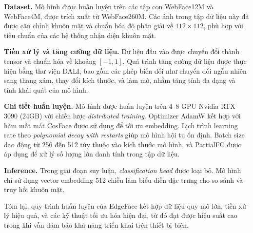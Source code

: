 \textbf{Dataset.} Mô hình được huấn luyện trên các tập con WebFace12M và WebFace4M, được trích xuất từ WebFace260M. 
Các ảnh trong tập dữ liệu này đã được căn chỉnh khuôn mặt và chuẩn hóa độ phân giải về $112\times112$, phù hợp với tiêu chuẩn của các hệ thống nhận diện khuôn mặt.

\textbf{Tiền xử lý và tăng cường dữ liệu.} Dữ liệu đầu vào được chuyển đổi thành tensor và chuẩn hóa về khoảng $[-1,1]$. 
Quá trình tăng cường dữ liệu được thực hiện bằng thư viện DALI, bao gồm các phép biến đổi như chuyển đổi ngẫu nhiên sang thang xám, thay đổi kích thước, và làm mờ, nhằm tăng tính đa dạng và tính khái quát của mô hình.

\textbf{Chi tiết huấn luyện.} Mô hình được huấn luyện trên 4--8 GPU Nvidia RTX 3090 (24GB) với chiến lược \textit{distributed training}. 
Optimizer AdamW kết hợp với hàm mất mát CosFace được sử dụng để tối ưu embedding. 
Lịch trình learning rate theo \textit{polynomial decay with restarts} giúp mô hình hội tụ ổn định. 
Batch size dao động từ 256 đến 512 tùy thuộc vào kích thước mô hình, và PartialFC được áp dụng để xử lý số lượng lớn danh tính trong tập dữ liệu.

\textbf{Inference.} Trong giai đoạn suy luận, \textit{classification head} được loại bỏ. 
Mô hình chỉ sử dụng vector embedding 512 chiều làm biểu diễn đặc trưng cho so sánh và truy hồi khuôn mặt.

Tóm lại, quy trình huấn luyện của EdgeFace kết hợp dữ liệu quy mô lớn, tiền xử lý hiệu quả, và các kỹ thuật tối ưu hóa hiện đại, từ đó đạt được hiệu suất cao trong khi vẫn đảm bảo khả năng triển khai trên thiết bị biên.
